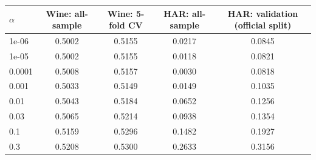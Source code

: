 \begin{tabular}{lcccc}
\toprule
$\alpha$ & Wine: all-sample & Wine: 5-fold CV & HAR: all-sample & HAR: validation (official split) \\
\midrule
1e-06 & 0.5002 & 0.5155 & 0.0217 & 0.0845 \\
1e-05 & 0.5002 & 0.5155 & 0.0118 & 0.0821 \\
0.0001 & 0.5008 & 0.5157 & 0.0030 & 0.0818 \\
0.001 & 0.5033 & 0.5149 & 0.0149 & 0.1035 \\
0.01 & 0.5043 & 0.5184 & 0.0652 & 0.1256 \\
0.03 & 0.5065 & 0.5214 & 0.0938 & 0.1354 \\
0.1 & 0.5159 & 0.5296 & 0.1482 & 0.1927 \\
0.3 & 0.5208 & 0.5300 & 0.2633 & 0.3156 \\
\bottomrule
\end{tabular}

